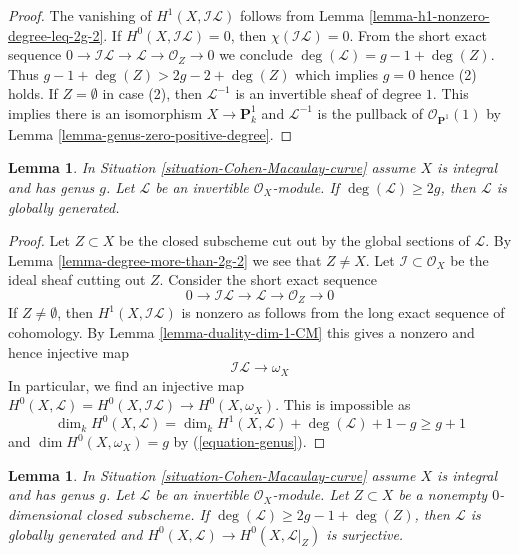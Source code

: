 \documentclass{stacks-project}
\newenvironment{reference}{\comment}{\endcomment}
\theoremstyle{plain}
\newtheorem{lemma}[subsection]{Lemma}
\theoremstyle{definition}
\theoremstyle{remark}
\numberwithin{equation}{subsection}
\begin{document}
\begin{proof}
The vanishing of $H^1(X, \mathcal{I}\mathcal{L})$ follows from
Lemma \ref{lemma-h1-nonzero-degree-leq-2g-2}.
If $H^0(X, \mathcal{I}\mathcal{L}) = 0$, then
$\chi(\mathcal{I}\mathcal{L}) = 0$. From the short exact
sequence $0 \to \mathcal{I}\mathcal{L} \to \mathcal{L} \to \mathcal{O}_Z \to 0$
we conclude $\deg(\mathcal{L}) = g - 1 + \deg(Z)$.
Thus $g - 1 + \deg(Z) > 2g - 2 + \deg(Z)$ which implies $g = 0$
hence (2) holds. If $Z = \emptyset$ in case (2),
then $\mathcal{L}^{-1}$ is an invertible sheaf of degree $1$.
This implies there is an isomorphism $X \to \mathbf{P}^1_k$ and
$\mathcal{L}^{-1}$ is the pullback of $\mathcal{O}_{\mathbf{P}^1}(1)$ by
Lemma \ref{lemma-genus-zero-positive-degree}.
\end{proof}

\begin{lemma}
\label{lemma-degree-more-than-2g}
\begin{reference}
\cite[Lemma 3]{Jongmin}
\end{reference}
In Situation \ref{situation-Cohen-Macaulay-curve}
assume $X$ is integral and has genus $g$.
Let $\mathcal{L}$ be an invertible $\mathcal{O}_X$-module.
If $\deg(\mathcal{L}) \geq 2g$, then $\mathcal{L}$
is globally generated.
\end{lemma}

\begin{proof}
Let $Z \subset X$ be the closed subscheme cut out by the
global sections of $\mathcal{L}$. By Lemma \ref{lemma-degree-more-than-2g-2}
we see that $Z \not = X$. Let $\mathcal{I} \subset \mathcal{O}_X$
be the ideal sheaf cutting out $Z$. Consider the short exact sequence
$$
0 \to \mathcal{I}\mathcal{L}
\to \mathcal{L} \to \mathcal{O}_Z \to 0
$$
If $Z \not = \emptyset$, then
$H^1(X, \mathcal{I}\mathcal{L})$ is nonzero
as follows from the long exact sequence of cohomology.
By Lemma \ref{lemma-duality-dim-1-CM} this gives a
nonzero and hence injective map
$$
\mathcal{I}\mathcal{L}
\longrightarrow
\omega_X
$$
In particular, we find an injective map
$H^0(X, \mathcal{L}) = H^0(X, \mathcal{I}\mathcal{L})
\to H^0(X, \omega_X)$. This is impossible as
$$
\dim_k H^0(X, \mathcal{L}) = \dim_k H^1(X, \mathcal{L}) +
\deg(\mathcal{L}) + 1 - g \geq g + 1
$$
and $\dim H^0(X, \omega_X) = g$ by (\ref{equation-genus}).
\end{proof}

\begin{lemma}
\label{lemma-degree-more-than-2g-1-and-Z}
In Situation \ref{situation-Cohen-Macaulay-curve}
assume $X$ is integral and has genus $g$.
Let $\mathcal{L}$ be an invertible $\mathcal{O}_X$-module.
Let $Z \subset X$ be a nonempty $0$-dimensional closed subscheme.
If $\deg(\mathcal{L}) \geq 2g - 1 + \deg(Z)$, then $\mathcal{L}$
is globally generated and $H^0(X, \mathcal{L}) \to H^0(X, \mathcal{L}|_Z)$
is surjective.
\end{lemma}
\end{document}
